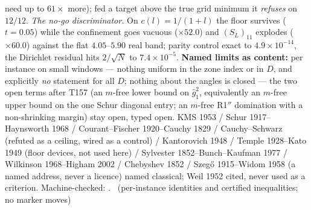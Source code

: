 need up to $61\times$ more); fed a target above the true grid minimum it
\emph{refuses} on $12/12$.
\emph{The no-go discriminator.} On $c(l)=1/(1+l)$ the floor survives
($t=0.05$) while the confinement goes vacuous ($\times52.0$) and
$(S_L)_{11}$ explodes ($\times60.0$) against the flat $4.05$--$5.90$
real band; parity control exact to $4.9\times10^{-14}$, the Dirichlet
residual hits $2/\sqrt N$ to $7.4\times10^{-5}$.
\textbf{Named limits as content:} per instance on small windows ---
nothing uniform in the zone index or in $D$, and explicitly \emph{no}
statement for all $D$; nothing about the angles is closed --- the two
open terms after T157 (an $m$-free lower bound on $\hat g_1^2$,
equivalently an $m$-free upper bound on the one Schur diagonal entry;
an $m$-free R1$''$ domination with a non-shrinking margin) stay open,
typed open.
KMS 1953 / Schur 1917--Haynsworth 1968 / Courant--Fischer 1920--Cauchy
1829 / Cauchy--Schwarz (refuted as a ceiling, wired as a control) /
Kantorovich 1948 / Temple 1928--Kato 1949 (floor devices, not used here)
/ Sylvester 1852--Bunch--Kaufman 1977 / Wilkinson 1968--Higham 2002 /
Chebyshev 1852 / Szeg\H{o} 1915--Widom 1958 (a named address, never a
licence) named classical; Weil 1952 cited, never used as a criterion.
Machine-checked:
.
\mE\ (per-instance identities and certified inequalities; no marker moves)



